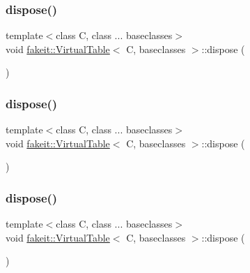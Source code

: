 \subsubsection{\texorpdfstring{dispose()}{dispose()}\hspace{0.1cm}{\footnotesize\ttfamily [1/10]}}
{\footnotesize\ttfamily template$<$class C, class ... baseclasses$>$ \\
void \mbox{\hyperlink{structfakeit_1_1VirtualTable}{fakeit\+::\+Virtual\+Table}}$<$ C, baseclasses $>$\+::dispose (\begin{DoxyParamCaption}{ }\end{DoxyParamCaption})\hspace{0.3cm}{\ttfamily [inline]}}

\mbox{\label{structfakeit_1_1VirtualTable_a58c2bfa93deb68aba5eced688c168e66}} 
\subsubsection{\texorpdfstring{dispose()}{dispose()}\hspace{0.1cm}{\footnotesize\ttfamily [2/10]}}
{\footnotesize\ttfamily template$<$class C, class ... baseclasses$>$ \\
void \mbox{\hyperlink{structfakeit_1_1VirtualTable}{fakeit\+::\+Virtual\+Table}}$<$ C, baseclasses $>$\+::dispose (\begin{DoxyParamCaption}{ }\end{DoxyParamCaption})\hspace{0.3cm}{\ttfamily [inline]}}

\mbox{\label{structfakeit_1_1VirtualTable_a58c2bfa93deb68aba5eced688c168e66}} 
\subsubsection{\texorpdfstring{dispose()}{dispose()}\hspace{0.1cm}{\footnotesize\ttfamily [3/10]}}
{\footnotesize\ttfamily template$<$class C, class ... baseclasses$>$ \\
void \mbox{\hyperlink{structfakeit_1_1VirtualTable}{fakeit\+::\+Virtual\+Table}}$<$ C, baseclasses $>$\+::dispose (\begin{DoxyParamCaption}{ }\end{DoxyParamCaption})\hspace{0.3cm}{\ttfamily [inline]}}


